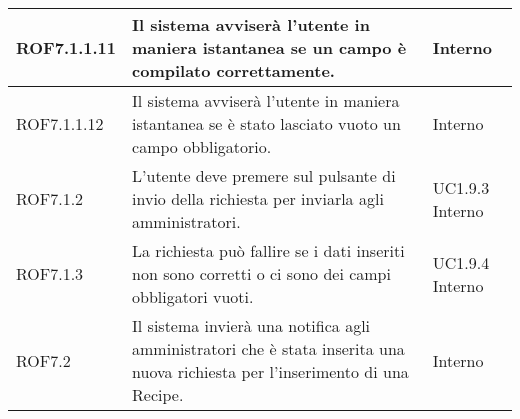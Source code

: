 \begin{center}
\begin{longtable}{| p{2.5cm} | p{8cm} | p{2cm} |}
		\hline
		ROF7.1.1.11 & Il sistema avviserà l'utente in maniera istantanea se un campo è compilato correttamente. & Interno \\
		\hline
		ROF7.1.1.12 & Il sistema avviserà l'utente in maniera istantanea se è stato lasciato vuoto un campo obbligatorio. & Interno \\
		\hline
		ROF7.1.2 & L'utente deve premere sul pulsante di invio della richiesta per inviarla agli amministratori. & UC1.9.3 \newline Interno \\
		\hline
		ROF7.1.3 & La richiesta può fallire se i dati inseriti non sono corretti o ci sono dei campi obbligatori vuoti. & UC1.9.4 \newline Interno \\
		\hline
		ROF7.2  & Il sistema invierà una notifica agli amministratori che è stata inserita una nuova richiesta per l'inserimento di una Recipe. & Interno \\
		\hline





\end{longtable}
\end{center}
